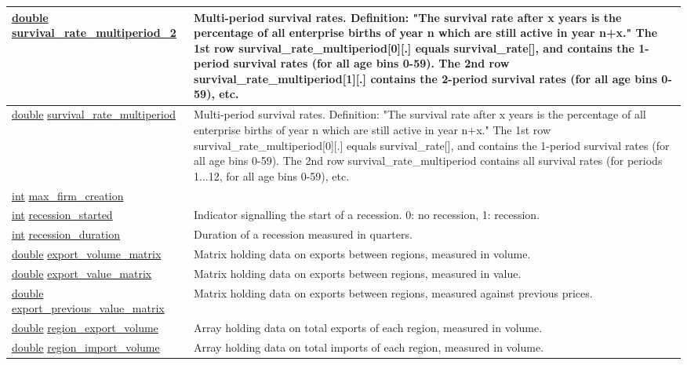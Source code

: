 \documentclass[a4paper,11pt]{article}
\begin{document}
\begin{landscape}
\begin{longtable}[H!]{ll}
\midrule
\url{double} \url{survival_rate_multiperiod_2} \index{\url{survival_rate_multiperiod_2}} & \parbox{10cm}{Multi-period survival rates. Definition: "The survival rate after x years is the percentage of all enterprise births of year n which are still active in year n+x." The 1st row survival\_rate\_multiperiod[0][.] equals survival\_rate[], and contains the 1-period survival rates (for all age bins 0-59). The 2nd row survival\_rate\_multiperiod[1][.] contains the 2-period survival rates (for all age bins 0-59), etc.} \\
\midrule
\url{double} \url{survival_rate_multiperiod}  & \parbox{10cm}{Multi-period survival rates. Definition: "The survival rate after x years is the percentage of all enterprise births of year n which are still active in year n+x." The 1st row survival\_rate\_multiperiod[0][.] equals survival\_rate[], and contains the 1-period survival rates (for all age bins 0-59). The 2nd row survival\_rate\_multiperiod contains all survival rates (for periods 1...12, for all age bins 0-59), etc.} \\
\midrule
\url{int} \url{max_firm_creation}  & \parbox{10cm}{} \\
\midrule
\url{int} \url{recession_started}  & \parbox{10cm}{Indicator signalling the start of a recession. 0: no recession, 1: recession.} \\
\midrule
\url{int} \url{recession_duration}  & \parbox{10cm}{Duration of a recession measured in quarters.} \\
\midrule
\url{double} \url{export_volume_matrix}  & \parbox{10cm}{Matrix holding data on exports between regions, measured in volume.} \\
\midrule
\url{double} \url{export_value_matrix}  & \parbox{10cm}{Matrix holding data on exports between regions, measured in value.} \\
\midrule
\url{double} \url{export_previous_value_matrix}  & \parbox{10cm}{Matrix holding data on exports between regions, measured against previous prices.} \\
\midrule
\url{double} \url{region_export_volume}  & \parbox{10cm}{Array holding data on total exports of each region, measured in volume.} \\
\midrule
\url{double} \url{region_import_volume}  & \parbox{10cm}{Array holding data on total imports of each region, measured in volume.} \\

\end{longtable}
\end{landscape}
\end{document}
